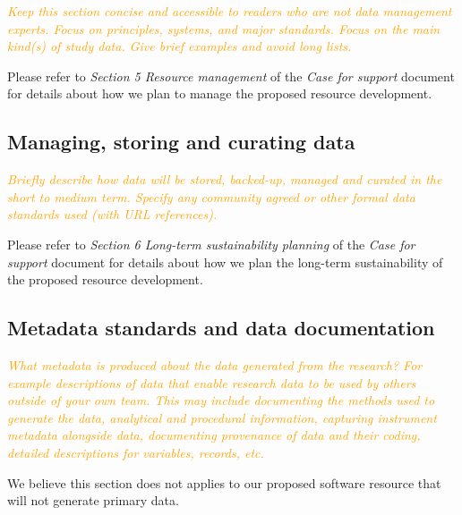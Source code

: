 \documentclass[a4paper,11pt]{article}
\begin{document}
\textcolor{orange}{\textit{Keep this section concise and accessible to readers who are not data management experts.  Focus on principles, systems, and major standards. Focus on the main kind(s) of study data.  Give brief examples and avoid long lists.}}

Please refer to \emph{Section 5 Resource management} of the \emph{Case for
support} document for details about how we plan to manage the proposed resource
development.

\subsection{Managing, storing and curating data}

\textcolor{orange}{\textit{Briefly describe how data will be stored, backed-up, managed and curated in the short to medium term. Specify any community agreed or other formal data standards used (with URL references).}}

Please refer to \emph{Section 6 Long-term sustainability planning} of the
\emph{Case for support} document for details about how we plan the long-term
sustainability of the proposed resource development.

\subsection{Metadata standards and data documentation}

\textcolor{orange}{\textit{What metadata is produced about the data generated from the research? For example descriptions of data that enable research data to be used by others outside of your own team.  This may include documenting the methods used to generate the data, analytical and procedural information, capturing instrument metadata alongside data, documenting provenance of data and their coding, detailed descriptions for variables, records, etc.}}

We believe this section does not applies to our proposed software resource that
will not generate primary data.
\end{document}

